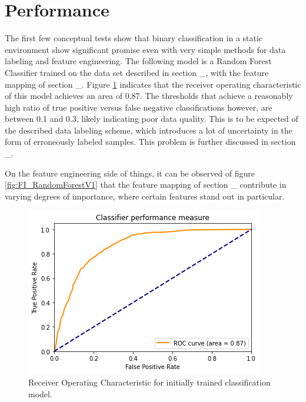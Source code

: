 \section{Performance} \label{sec:res_Performance}

The first few conceptual tests show that binary classification in a static environment show significant promise even with very simple methods for data labeling and feature engineering. The following model is a Random Forest Classifier trained on the data set described in section \_, with the feature mapping of section \_. Figure \ref{fig:ROC_RandomForestV1} indicates that the receiver operating characteristic of this model achieves an area of 0.87. The thresholds that achieve a reasonably high ratio of true positive versus false negative classifications however, are between 0.1 and 0.3, likely indicating poor data quality. This is to be expected of the described data labeling scheme, which introduces a lot of uncertainty in the form of erroneously labeled samples. This problem is further discussed in section \_.

On the feature engineering side of things, it can be observed of figure \ref{fig:FI_RandomForestV1} that the feature mapping of section \_ contribute in varying degrees of importance, where certain features stand out in particular. 

\begin{figure}[h]
    \centering
    \includegraphics[width=\textwidth]{Images/Models/ROC_RandomForestV1.png}
    \caption{Receiver Operating Characteristic for initially trained classification model.}
    \label{fig:ROC_RandomForestV1}
\end{figure}

